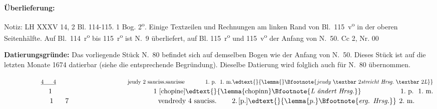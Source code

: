 \begin{ledgroupsized}[r]{120mm}
\footnotesize
\pstart
\noindent\textbf{\"{U}berlieferung:}
\pend
\end{ledgroupsized}
%
\begin{ledgroupsized}[r]{114mm}
\footnotesize
\pstart
\parindent -6mm
%
Notiz:
LH XXXV 14, 2 Bl. 114-115.
1 Bog. 2\textsuperscript{o}.
Einige Textzeilen und Rechnungen am linken Rand von Bl.~115~v\textsuperscript{o} in der oberen Seitenhälfte.
Auf Bl.~114~r\textsuperscript{o} bis 115~r\textsuperscript{o} ist N.~9 %
überliefert, auf Bl. 115~r\textsuperscript{o} und 115~v\textsuperscript{o} der Anfang von N.~50.%
\newline%
Cc 2, Nr. 00
\pend
\end{ledgroupsized}
\vspace*{5mm}
\begin{ledgroup}
\footnotesize
\pstart
\noindent
\footnotesize{%
\textbf{Datierungsgr\"{u}nde:}
Das vorliegende Stück N.~80
befindet sich auf demselben Bogen wie der Anfang von N.~50. %
Dieses Stück ist auf die letzten Monate 1674
 datierbar
(siehe die entsprechende Begründung).
Dieselbe Datierung wird folglich auch für N.~80 %
übernommen.%
}%
\pend
\end{ledgroup}
\vspace*{8mm}
\pstart
\noindent
%
$\displaystyle\hspace*{22,5mm}\underline{4\hspace*{6mm}4}%
\hspace*{45mm}\mbox{jeudy}\ 2\ \mbox{sauciss.\protect\index{Sachverzeichnis}{saucisse}}\hspace*{12,9mm}1.\ \mbox{p.}\ \ 1.\ \mbox{m.}\edtext{}{\lemma{}\Bfootnote{jeudy\ \textbar\ 2 \textit{streicht Hrsg.}\ \textbar\ 2 \textit{L}}}$\\
%
$\displaystyle\hspace*{22,5mm}1%
\hspace*{52,7mm}1\ \mbox{[chopine]\edtext{}{\lemma{chopinn}\Bfootnote{\textit{L ändert Hrsg.}}}}\hspace*{20,4mm}1.\ \mbox{p.}\ \ 1.\ \mbox{m.}$\\
%
$\displaystyle\hspace*{22,5mm}1\hspace*{6mm}7%
\hspace*{45mm}\mbox{vendredy}\ 4\ \mbox{sauciss.}\hspace*{7,7mm}2.\hspace*{0,5mm} \mbox{[p.]}\edtext{}{\lemma{p.}\Bfootnote{\textit{erg. Hrsg.}}}\ \hspace*{0,2mm} 2.\ \mbox{m.}$\\
